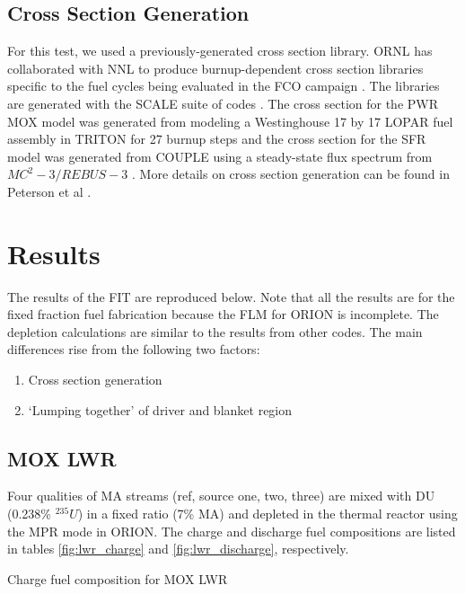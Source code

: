 \documentclass{article}
\begin{document}
\subsection{Cross Section Generation}
For this test, we used a previously-generated cross section library.
\gls{ORNL} has collaborated with \gls{NNL} to produce burnup-dependent cross section libraries specific to the fuel
cycles being evaluated in the FCO campaign \cite{wigeland_nuclear_2014}. The libraries are generated with the
SCALE suite of codes \cite{noauthor_scale_nodate}. The cross section for the \gls{PWR} \gls{MOX} model was generated from modeling
a Westinghouse 17 by 17 LOPAR fuel assembly in TRITON for 27 burnup steps and the cross section for the \gls{SFR}
model was generated from COUPLE using a steady-state flux spectrum from $MC^2-3 / REBUS-3$ \cite{lee_mc2-3:_2013}.
More details on cross section generation can be found in Peterson et al \cite{peterson_generating_2016}.


\section{Results}
The results of the \gls{FIT} are reproduced below. Note that all the results are for the fixed fraction
fuel fabrication because the \gls{FLM} for ORION is incomplete. The depletion calculations are similar to the
results from other codes. The main differences rise from the following two factors:

\begin{enumerate}
    \item Cross section generation
    \item `Lumping together' of driver and blanket region
\end{enumerate}

\subsection{\gls{MOX} \gls{LWR}}
Four qualities of \gls{MA} streams (ref, source one, two, three) are mixed with 
\gls{DU} (0.238\% $^{235}U$) in a fixed ratio (7\% \gls{MA}) and depleted in the thermal reactor
using the MPR mode in ORION. The charge and discharge fuel compositions are listed in
tables \ref{fig:lwr_charge} and \ref{fig:lwr_discharge}, respectively.

\begin{table}[h]
    \centering
    
    \caption{Charge fuel composition for \gls{MOX} \gls{LWR}}
    \label{fig:lwr_charge}
\end{table}
\end{document}
